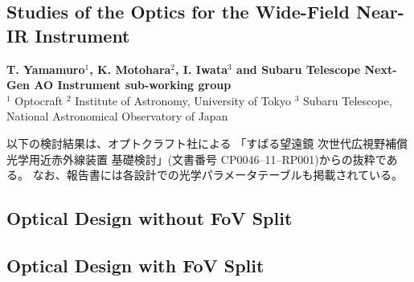 \def\thisdir{instrument/optics/}

\begin{center}
\section{Studies of the Optics for the Wide-Field Near-IR Instrument
\label{sec:inst_optics}}
\vspace{0.5cm}

\noindent
\large
{\bf T. Yamamuro$^{1}$, K. Motohara$^{2}$, I. Iwata$^{3}$ and Subaru
Telescope Next-Gen AO Instrument sub-working group}\\
$^1$ Optocraft
$^2$ Institute of Astronomy, University of Tokyo
$^3$ Subaru Telescope, National Astronomical Observatory of Japan
\vspace{0.5cm}

\end{center}

以下の検討結果は、オプトクラフト社による
「すばる望遠鏡 次世代広視野補償光学用近赤外線装置 基礎検討」(文書番号
CP0046--11--RP001)からの抜粋である。
なお、報告書には各設計での光学パラメータテーブルも掲載されている。


\subsection{Optical Design without FoV Split}

\subsection{Optical Design with FoV Split}
